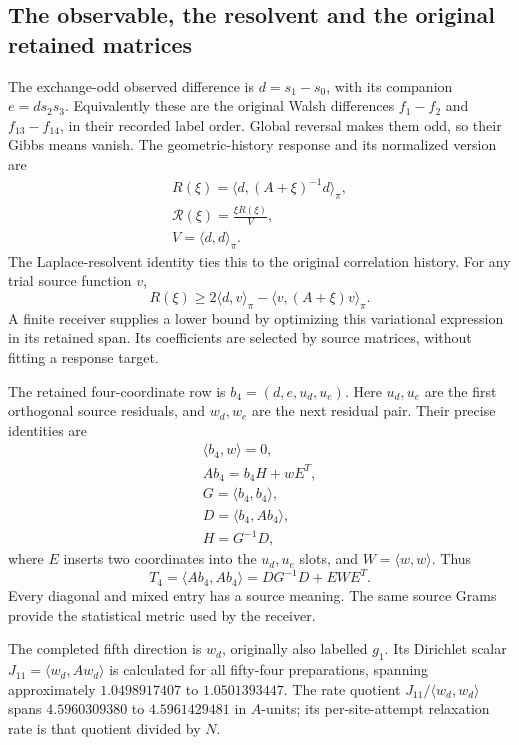 \subsection{The observable, the resolvent and the original retained matrices}

The exchange-odd observed difference is $d=s_1-s_0$, with its companion $e=d s_2s_3$. Equivalently these are the original Walsh differences $f_1-f_2$ and $f_{13}-f_{14}$, in their recorded label order. Global reversal makes them odd, so their Gibbs means vanish. The geometric-history response and its normalized version are
\[
\begin{gathered}
R(\xi)=\langle d,(A+\xi)^{-1}d\rangle_\pi,
 \\
\mathcal R(\xi)=\frac{\xi R(\xi)}V,
 \\
V=\langle d,d\rangle_\pi.
\end{gathered}
\]
The Laplace-resolvent identity ties this to the original correlation history. For any trial source function $v$,
\[
 R(\xi)\geq2\langle d,v\rangle_\pi
                       -\langle v,(A+\xi)v\rangle_\pi.
\]
A finite receiver supplies a lower bound by optimizing this variational expression in its retained span. Its coefficients are selected by source matrices, without fitting a response target. 

The retained four-coordinate row is $b_4=(d,e,u_d,u_e)$. Here $u_d,u_e$ are the first orthogonal source residuals, and $w_d,w_e$ are the next residual pair. Their precise identities are
\[
\begin{gathered}
\langle b_4,w\rangle=0,\\
Ab_4=b_4H+wE^T,\\
G=\langle b_4,b_4\rangle,\\
D=\langle b_4,Ab_4\rangle,
 \\
H=G^{-1}D,
\end{gathered}
\]
where $E$ inserts two coordinates into the $u_d,u_e$ slots, and $W=\langle w,w\rangle$. Thus
\[
 T_4=\langle Ab_4,Ab_4\rangle=DG^{-1}D+EWE^T.
\]
Every diagonal and mixed entry has a source meaning. The same source Grams provide the statistical metric used by the receiver.

The completed fifth direction is $w_d$, originally also labelled $g_1$. Its Dirichlet scalar $J_{11}=\langle w_d,Aw_d\rangle$ is calculated for all fifty-four preparations, spanning approximately $1.0498917407$ to $1.0501393447$. The rate quotient $J_{11}/\langle w_d,w_d\rangle$ spans $4.5960309380$ to $4.5961429481$ in $A$-units; its per-site-attempt relaxation rate is that quotient divided by $N$.

